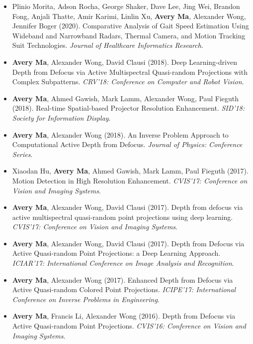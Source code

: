 \begin{adjustwidth}{\indentleft}{\indentright}
\begin{itemize}
            \item Plinio Morita, Adson Rocha, George Shaker, Dave Lee, Jing Wei, Brandon Fong, Anjali Thatte, Amir Karimi, Linlin Xu, \textbf{Avery Ma}, Alexander Wong, Jennifer Boger (2020). Comparative Analysis of Gait Speed Estimation Using Wideband and Narrowband Radars, Thermal Camera, and Motion Tracking Suit Technologies. \emph{Journal of Healthcare Informatics Research}.
            
            \item \textbf{Avery Ma}, Alexander Wong, David Clausi (2018). Deep Learning-driven Depth from Defocus via Active Multispectral Quasi-random Projections with Complex Subpatterns. \emph{CRV'18: Conference on Computer and Robot Vision}.
            
            \item \textbf{Avery Ma}, Ahmed Gawish, Mark Lamm, Alexander Wong, Paul Fieguth (2018). Real-time Spatial-based Projector Resolution Enhancement. \emph{SID'18: Society for Information Display}.
            
            \item \textbf{Avery Ma}, Alexander Wong (2018). An Inverse Problem Approach to Computational Active Depth from Defocus. \emph{Journal of Physics: Conference Series}.
            
            \item Xiaodan Hu, \textbf{Avery Ma}, Ahmed Gawish, Mark Lamm, Paul Fieguth (2017). Motion Detection in High Resolution Enhancement. \emph{CVIS'17: Conference on Vision and Imaging Systems}.
            
            \item \textbf{Avery Ma}, Alexander Wong, David Clausi (2017). Depth from defocus via active multispectral quasi-random point projections using deep learning. \emph{CVIS'17: Conference on Vision and Imaging Systems}.
            
            \item \textbf{Avery Ma}, Alexander Wong, David Clausi (2017). Depth from Defocus via Active Quasi-random Point Projections: a Deep Learning Approach. \emph{ICIAR'17: International Conference on Image Analysis and Recognition}.
            
            \item \textbf{Avery Ma}, Alexander Wong (2017). Enhanced Depth from Defocus via Active Quasi-random Colored Point Projections. \emph{ICIPE'17: International Conference on Inverse Problems in Engineering}.
                   
            \item \textbf{Avery Ma}, Francis Li, Alexander Wong (2016). Depth from Defocus via Active Quasi-random Point Projections. \emph{CVIS'16: Conference on Vision and Imaging Systems}.
       
        \end{itemize}
        \hfill
        
        
 
        
    \end{adjustwidth}
